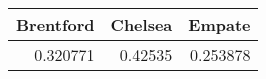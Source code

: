 \begin{tabular}{rrr}
\hline
   Brentford &   Chelsea &   Empate \\
\hline
    0.320771 &   0.42535 & 0.253878 \\
\hline
\end{tabular}